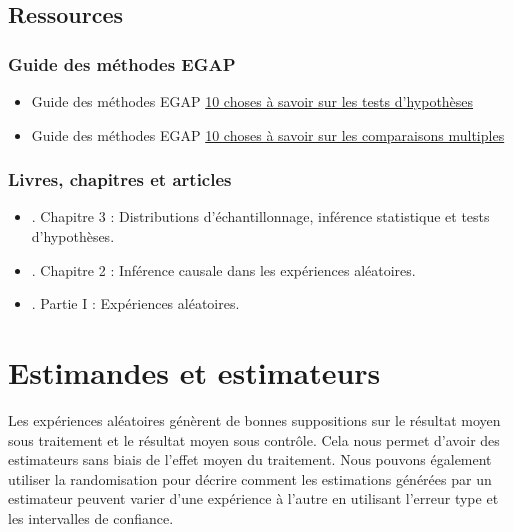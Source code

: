 \documentclass[
  12pt,
]{book}
\begin{document}
\hypertarget{ressources-3}{%
\section{Ressources}\label{ressources-3}}

\hypertarget{guide-des-muxe9thodes-egap-3}{%
\subsection{Guide des méthodes EGAP}\label{guide-des-muxe9thodes-egap-3}}

\begin{itemize}
\item
  Guide des méthodes EGAP \href{https://egap.org/resource/10-things-to-know-about-hypothesis-testing/}{10 choses à savoir sur les tests d'hypothèses}
\item
  Guide des méthodes EGAP \href{https://egap.org/resource/10-things-to-know-about-multiple-comparisons/}{10 choses à savoir sur les comparaisons multiples}
\end{itemize}

\hypertarget{livres-chapitres-et-articles-2}{%
\subsection{Livres, chapitres et articles}\label{livres-chapitres-et-articles-2}}

\begin{itemize}
\item
  \autocite{gerber_field_2012}. Chapitre 3 : Distributions d'échantillonnage, inférence statistique et tests d'hypothèses.
\item
  \autocite{rosenbaum2010design}. Chapitre 2 : Inférence causale dans les expériences aléatoires.
\item
  \autocite{rosenbaum2017observation}. Partie I : Expériences aléatoires.
\end{itemize}

\hypertarget{estimandes-et-estimateurs}{%
\chapter{Estimandes et estimateurs}\label{estimandes-et-estimateurs}}

Les expériences aléatoires génèrent de bonnes suppositions sur le résultat moyen sous traitement et le résultat moyen sous contrôle. Cela nous permet d'avoir des estimateurs sans biais de l'effet moyen du traitement. Nous pouvons également utiliser la randomisation pour décrire comment les estimations générées par un estimateur peuvent varier d'une expérience à l'autre en utilisant l'erreur type et les intervalles de confiance.
\end{document}
